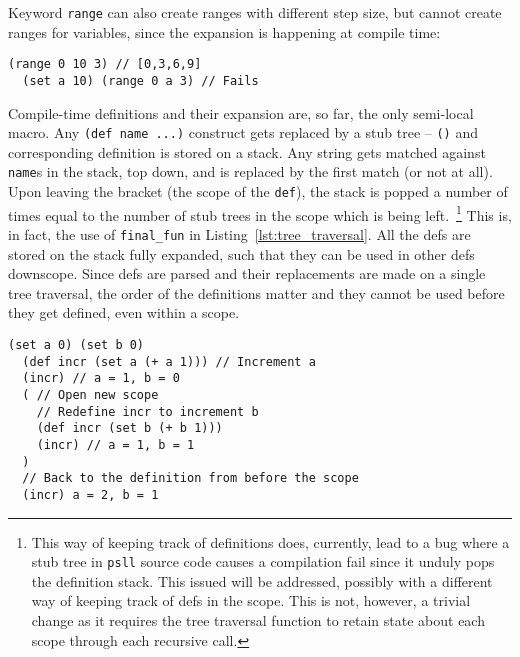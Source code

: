 \documentclass[aip,jcp,reprint,footinbib]{revtex4-1}
\makeatletter
\let\tt\texttt
\newcommand\psll{\texttt{psll}\xspace}
\newcommand{\ilpsll}[1]{\lstinline[language=psll,columns=flexible]{#1}}
\renewcommand\paragraph{\@startsection{paragraph}{4}{\parindent}{\parskip}{-1em}{\normalfont \normalsize \bfseries}}
\makeatother
\begin{document}
Keyword \tt{range} can also create ranges with different step size, but cannot create ranges for variables, since the expansion is happening at compile time:
\begin{lstlisting}[language=psll,aboveskip=3pt,frame=none,numbers=none]
  (range 0 10 3) // [0,3,6,9]
  (set a 10) (range 0 a 3) // Fails
\end{lstlisting}

\paragraph{Definitions} Compile-time definitions and their expansion are, so far, the only semi-local macro. Any \ilpsll{(def name ...)} construct gets replaced by a stub tree -- \tt{()} and corresponding definition is stored on a stack. Any string gets matched against \tt{name}s in the stack, top down, and is replaced by the first match (or not at all). Upon leaving the bracket (the scope of the \tt{def}), the stack is popped a number of times equal to the number of stub trees in the scope which is being left.~\footnote{This way of keeping track of definitions does, currently, lead to a bug where a stub tree in \psll source code causes a compilation fail since it unduly pops the definition stack. This issued will be addressed, possibly with a different way of keeping track of defs in the scope. This is not, however, a trivial change as it requires the tree traversal function to retain state about each scope through each recursive call.} This is, in fact, the use of \tt{final\_fun} in Listing~\ref{lst:tree_traversal}. All the defs are stored on the stack fully expanded, such that they can be used in other defs downscope. Since defs are parsed and their replacements are made on a single tree traversal, the order of the definitions matter and they cannot be used before they get defined, even within a scope.

\begin{lstlisting}[language=psll,aboveskip=3pt,belowskip=-2pt,frame=none,numbers=none]
  (set a 0) (set b 0)
  (def incr (set a (+ a 1))) // Increment a
  (incr) // a = 1, b = 0
  ( // Open new scope
    // Redefine incr to increment b
    (def incr (set b (+ b 1)))
    (incr) // a = 1, b = 1
  )
  // Back to the definition from before the scope
  (incr) a = 2, b = 1
\end{lstlisting}
\end{document}

